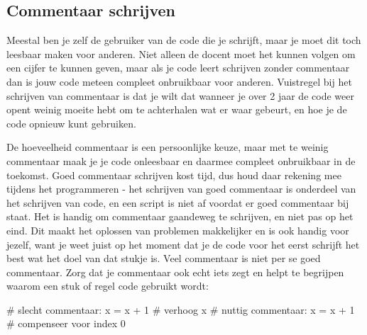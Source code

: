 \documentclass[a4paper,11pt, fleqn]{article}
\begin{document}
\subsection{Commentaar schrijven}
Meestal ben je zelf de gebruiker van de code die je schrijft, maar je moet dit toch leesbaar maken voor anderen. Niet alleen de docent moet het kunnen volgen om een cijfer te kunnen geven, maar als je code leert schrijven zonder commentaar dan is jouw code meteen compleet onbruikbaar voor anderen. Vuistregel bij het schrijven van commentaar is dat je wilt dat wanneer je over 2 jaar de code weer opent weinig moeite hebt om te achterhalen wat er waar gebeurt, en hoe je de code opnieuw kunt gebruiken.

De hoeveelheid commentaar is een persoonlijke keuze, maar met te weinig commentaar maak je je code onleesbaar en daarmee compleet onbruikbaar in de toekomst. Goed commentaar schrijven kost tijd, dus houd daar rekening mee tijdens het programmeren - het schrijven van goed commentaar is onderdeel van het schrijven van code, en een script is niet af voordat er goed commentaar bij staat. Het is handig om commentaar gaandeweg te schrijven, en niet pas op het eind. Dit maakt het oplossen van problemen makkelijker en is ook handig voor jezelf, want je weet juist op het moment dat je de code voor het eerst schrijft het best wat het doel van dat stukje is.
Veel commentaar is niet per se goed commentaar. Zorg dat je commentaar ook echt iets zegt en helpt te begrijpen waarom een stuk of regel code gebruikt wordt:
\begin{python}
# slecht commentaar:
x = x + 1         # verhoog x
# nuttig commentaar:
x = x + 1         # compenseer voor index 0
\end{python}
\end{document}

